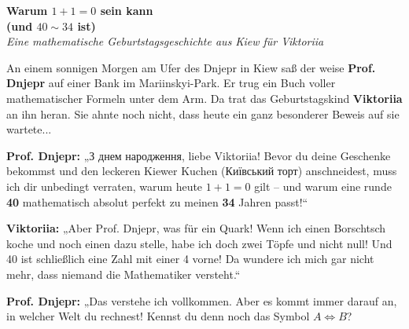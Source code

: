 \documentclass[11pt,a4paper]{article}
\begin{document}
	
	\begin{tcolorbox}[
		colback=kievblue,
		colframe=darknavy,
		arc=4mm,
		boxrule=1pt,
		top=12pt, bottom=12pt,
		halign=center
		]
		{\Huge \color{white} \bfseries Warum $1 + 1 = 0$ sein kann}\\[4pt]
		{\LARGE \color{kievyellow} \bfseries (und $40 \sim 34$ ist)}\\[6pt]
		{\large \color{white} \itshape Eine mathematische Geburtstagsgeschichte aus Kiew für Viktoriia}
	\end{tcolorbox}
	
	\vspace{3mm}
	
	\begin{tcolorbox}[
		colback=white,
		colframe=kievblue,
		boxrule=0pt,
		leftrule=4pt,
		arc=2mm,
		fontupper=\itshape
		]
		An einem sonnigen Morgen am Ufer des Dnjepr in Kiew saß der weise \textbf{Prof. Dnjepr} auf einer Bank im Mariinskyi-Park. Er trug ein Buch voller mathematischer Formeln unter dem Arm. Da trat das Geburtstagskind \textbf{Viktoriia} an ihn heran. Sie ahnte noch nicht, dass heute ein ganz besonderer Beweis auf sie wartete...
	\end{tcolorbox}
	
	\vspace{2mm}
	
	\noindent \textcolor{burgundy}{\textbf{Prof. Dnjepr:}} „З днем народження, liebe Viktoriia! Bevor du deine Geschenke bekommst und den leckeren Kiewer Kuchen (Київський торт) anschneidest, muss ich dir unbedingt verraten, warum heute $1 + 1 = 0$ gilt – und warum eine runde \textbf{40} mathematisch absolut perfekt zu meinen \textbf{34} Jahren passt!“
	
	\vspace{2mm}
	
	\noindent \textcolor{kievblue}{\textbf{Viktoriia:}} „Aber Prof. Dnjepr, was für ein Quark! Wenn ich einen Borschtsch koche und noch einen dazu stelle, habe ich doch zwei Töpfe und nicht null! Und 40 ist schließlich eine Zahl mit einer 4 vorne! Da wundere ich mich gar nicht mehr, dass niemand die Mathematiker versteht.“
	
	\vspace{2mm}
	
	\noindent \textcolor{burgundy}{\textbf{Prof. Dnjepr:}} „Das verstehe ich vollkommen. Aber es kommt immer darauf an, in welcher Welt du rechnest! Kennst du denn noch das Symbol $A \Leftrightarrow B$?
\end{document}
